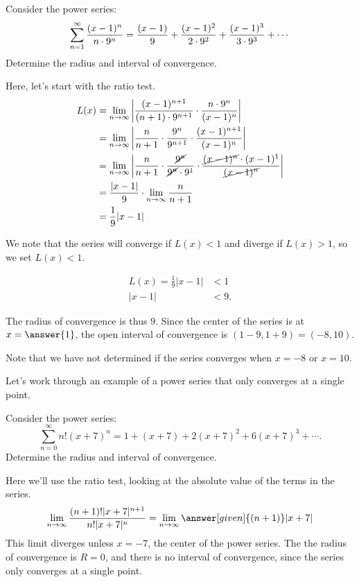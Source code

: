 \documentclass{ximera}
\begin{document}
\begin{example}
  Consider the power series:
  \[
  \sum_{n=1}^\infty \frac{(x-1)^n}{n \cdot 9^n} = \frac{(x-1)}{9} + \frac{(x-1)^2}{2\cdot 9^2} + \frac{(x-1)^3}{3\cdot 9^3} + \cdots\\
  \]
  Determine the radius and interval of convergence.
  \begin{explanation}
    Here, let's start with the ratio test.  
    \begin{align*}
     L(x) & =  \lim_{n\to\infty} \left| \frac{(x-1)^{n+1}}{(n+1)\cdot 9^{n+1}} \cdot \frac{n \cdot 9^n}{(x-1)^n} \right| \\
     &=  \lim_{n\to\infty} \left| \frac{n}{n+1} \cdot \frac{9^n}{9^{n+1}} \cdot \frac{(x-1)^{n+1}}{(x-1)^n} \right| \\
     &=  \lim_{n\to\infty} \left| \frac{n}{n+1} \cdot \frac{\cancel{9^n}}{\cancel{9^n} \cdot 9^1} \cdot \frac{\cancel{(x-1)^n} \cdot(x-1)^1}{\cancel{(x-1)^n}} \right| \\
     &= \frac{|x-1|}{9} \cdot  \lim_{n \to \infty} \frac{n}{n+1} \\
     &= \frac{1}{9}|x-1|
      \end{align*}

We note that the series will converge if $L(x) <1$ and diverge if $L(x) >1$, so we set $L(x)<1$.

\begin{align*}
L(x) = \frac{1}{9}|x-1| &<1 \\
|x-1| & < 9.
\end{align*}      

The radius of convergence is thus $9$.  Since the center of the series is at $x= \answer{1}$, the open interval of convergence is $(1-9,1+9) = (-8,10)$.

Note that we have not determined if the series converges when $x=-8$ or $x=10$.
        \end{explanation}
\end{example}

Let's work through an example of a power series that only converges at a single
point.

\begin{example}
  Consider the power series:
  \[
  \sum_{n=0}^\infty n!(x+7)^n = 1 + (x+7) + 2(x+7)^2 + 6(x+7)^3 + \cdots.
  \]
  Determine the radius and interval of convergence.
  \begin{explanation}
    Here we'll use the ratio test, looking at the absolute value of
    the terms in the series.
    \[
    \lim_{n\to\infty} \frac{(n+1)!|x+7|^{n+1}}{n!|x+7|^n}= \lim_{n\to\infty} \answer[given]{(n+1)}|x+7|
    \]
    This limit diverges unless $x=-7$, the center of the power
    series. The the radius of convergence is $R=0$, and there is no
    interval of convergence, since the series only converges at a
    single point.
  \end{explanation}
\end{example}
\end{document}
